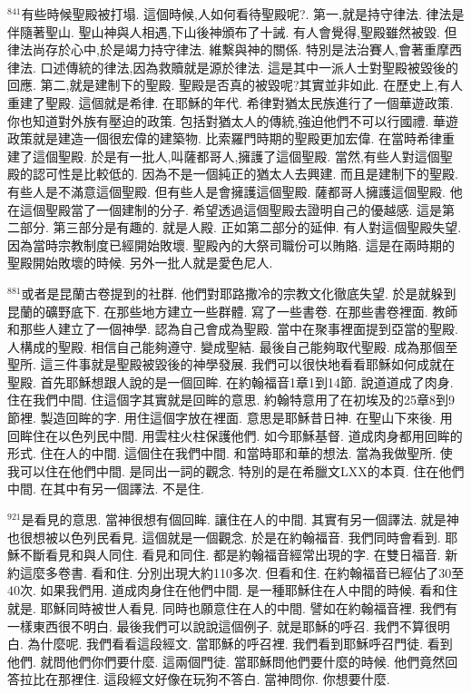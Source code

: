 \documentclass{book}
\begin{document}
$^{841}$有些時候聖殿被打塌.
這個時候,人如何看待聖殿呢?.
第一,就是持守律法.
律法是伴隨著聖山.
聖山神與人相遇,下山後神頒布了十誡.
有人會覺得,聖殿雖然被毀.
但律法尚存於心中,於是竭力持守律法.
維繫與神的關係.
特別是法治賽人,會著重摩西律法.
口述傳統的律法,因為救贖就是源於律法.
這是其中一派人士對聖殿被毀後的回應.
第二,就是建制下的聖殿.
聖殿是否真的被毀呢?其實並非如此.
在歷史上,有人重建了聖殿.
這個就是希律.
在耶穌的年代.
希律對猶太民族進行了一個華遊政策.
你也知道對外族有壓迫的政策.
包括對猶太人的傳統,強迫他們不可以行國禮.
華遊政策就是建造一個很宏偉的建築物.
比索羅門時期的聖殿更加宏偉.
在當時希律重建了這個聖殿.
於是有一批人,叫薩都哥人,擁護了這個聖殿.
當然,有些人對這個聖殿的認可性是比較低的.
因為不是一個純正的猶太人去興建.
而且是建制下的聖殿.
有些人是不滿意這個聖殿.
但有些人是會擁護這個聖殿.
薩都哥人擁護這個聖殿.
他在這個聖殿當了一個建制的分子.
希望透過這個聖殿去證明自己的優越感.
這是第二部分.
第三部分是有趣的.
就是人殿.
正如第二部分的延伸.
有人對這個聖殿失望.
因為當時宗教制度已經開始敗壞.
聖殿內的大祭司職份可以賄賂.
這是在兩時期的聖殿開始敗壞的時候.
另外一批人就是愛色尼人.

$^{881}$或者是昆蘭古卷提到的社群.
他們對耶路撒冷的宗教文化徹底失望.
於是就躲到昆蘭的礦野底下.
在那些地方建立一些群體.
寫了一些書卷.
在那些書卷裡面.
教師和那些人建立了一個神學.
認為自己會成為聖殿.
當中在聚事裡面提到亞當的聖殿.
人構成的聖殿.
相信自己能夠遵守.
變成聖結.
最後自己能夠取代聖殿.
成為那個至聖所.
這三件事就是聖殿被毀後的神學發展.
我們可以很快地看看耶穌如何成就在聖殿.
首先耶穌想跟人說的是一個回眸.
在約翰福音1章1到14節.
說道道成了肉身.
住在我們中間.
住這個字其實就是回眸的意思.
約翰特意用了在初埃及的25章8到9節裡.
製造回眸的字.
用住這個字放在裡面.
意思是耶穌昔日神.
在聖山下來後.
用回眸住在以色列民中間.
用雲柱火柱保護他們.
如今耶穌基督.
道成肉身都用回眸的形式.
住在人的中間.
這個住在我們中間.
和當時耶和華的想法.
當為我做聖所.
使我可以住在他們中間.
是同出一詞的觀念.
特別的是在希臘文LXX的本頁.
住在他們中間.
在其中有另一個譯法.
不是住.

$^{921}$是看見的意思.
當神很想有個回眸.
讓住在人的中間.
其實有另一個譯法.
就是神也很想被以色列民看見.
這個就是一個觀念.
於是在約翰福音.
我們同時會看到.
耶穌不斷看見和與人同住.
看見和同住.
都是約翰福音經常出現的字.
在雙日福音.
新約這麼多卷書.
看和住.
分別出現大約110多次.
但看和住.
在約翰福音已經佔了30至40次.
如果我們用.
道成肉身住在他們中間.
是一種耶穌住在人中間的時候.
看和住就是.
耶穌同時被世人看見.
同時也願意住在人的中間.
譬如在約翰福音裡.
我們有一樣東西很不明白.
最後我們可以說說這個例子.
就是耶穌的呼召.
我們不算很明白.
為什麼呢.
我們看看這段經文.
當耶穌的呼召裡.
我們看到耶穌呼召門徒.
看到他們.
就問他們你們要什麼.
這兩個門徒.
當耶穌問他們要什麼的時候.
他們竟然回答拉比在那裡住.
這段經文好像在玩狗不答白.
當神問你.
你想要什麼.
\end{document}
